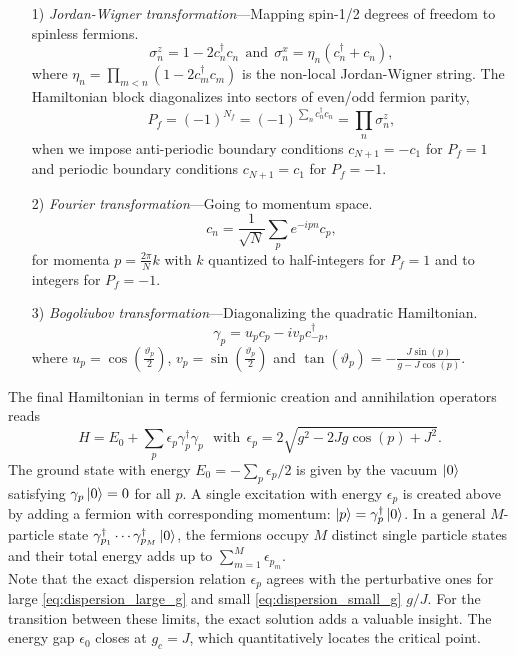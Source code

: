 \begin{enumerate}
	\item[1)] \textit{Jordan-Wigner transformation}---Mapping spin-1/2 degrees of freedom to spinless fermions.
	\begin{equation}
		\sigma^z_n = 1 - 2c_n^{\dagger}c_n \:\: \text{and} \:\: \sigma^x_n = \eta_n (c_n^{\dagger} + c_n),
	\end{equation}
	where $\eta_n = \prod_{m<n}(1-2c_m^{\dagger}c_m)$ is the non-local Jordan-Wigner string. The Hamiltonian block diagonalizes into sectors of even/odd fermion parity,
\begin{equation}
	P_f = (-1)^{N_f} = (-1)^{\sum_n c_n^{\dagger} c_n} = \prod_n \sigma^z_n,
\end{equation}
when we impose anti-periodic boundary conditions $c_{N+1} = -c_1$ for $P_f = 1$ and periodic boundary conditions $c_{N+1} = c_1$ for $P_f = -1$.	
	\item[2)] \textit{Fourier transformation}---Going to momentum space.
	\begin{equation}
		c_n = \frac{1}{\sqrt{N}}\sum_p e^{-ipn}c_p,
	\end{equation}
	for momenta $p = \frac{2 \pi}{N}k$ with $k$ quantized to half-integers for $P_f = 1$ and to integers for $P_f = -1$.
	
	\item[3)] \textit{Bogoliubov transformation}---Diagonalizing the quadratic Hamiltonian.
	\begin{equation}
		\gamma_p = u_p c_p - i v_p c_{-p}^{\dagger},
	\end{equation}
	where $u_p = \cos(\frac{\vartheta_p}{2})$, $v_p = \sin(\frac{\vartheta_p}{2})$ and $\tan(\vartheta_p) = -\frac{J\sin(p)}{g - J\cos(p)}$. \\
\end{enumerate}

\noindent The final Hamiltonian in terms of fermionic creation and annihilation operators reads
\begin{equation}
	H = E_0 + \sum_p \epsilon_p \gamma_p^{\dagger} \gamma_p \:\:\: \text{with} \:\: \epsilon_p = 2\sqrt{g^2 - 2 J g \cos(p) + J^2}.
\end{equation}
The ground state with energy $E_0 = - \sum_p \epsilon_p/2$ is given by the vacuum $\ket{0}$ satisfying $\gamma_p \ket{0} = 0$ for all $p$. A single excitation with energy $\epsilon_p$ is created above by adding a fermion with corresponding momentum: $\ket{p} = \gamma_p^{\dagger} \ket{0}$. In a general $M$-particle state $\gamma_{p_1}^{\dagger} \cdots \gamma_{p_M}^{\dagger} \ket{0}$, the fermions occupy $M$ distinct single particle states and their total energy adds up to $\sum_{m=1}^M \epsilon_{p_m}$. \\

\noindent Note that the exact dispersion relation $\epsilon_p$ agrees with the perturbative ones for large \eqref{eq:dispersion_large_g} and small \eqref{eq:dispersion_small_g} $g/J$. For the transition between these limits, the exact solution adds a valuable insight. The energy gap $\epsilon_0$ closes at $g_c = J$, which quantitatively locates the critical point.